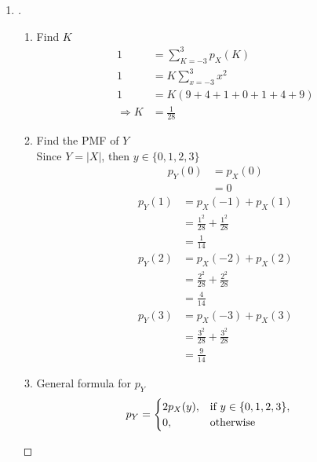 \documentclass[paper=usletter, fontsize=12pt]{article}
\begin{document}
\begin{enumerate}
        \item
        \begin{proof}[\unskip\nopunct]

            \begin{enumerate}

                \item Find $K$
                \begin{align*}
                    1 & = \sum_{K = -3}^{3} p_X(K)\\
                    1 & = K\sum_{x = -3}^{3} x^2\\
                    1 & = K(9 + 4 + 1 + 0 + 1 + 4 + 9) \\
                    \Rightarrow K & = \frac{1}{28}
                \end{align*}

                \item Find the PMF of $Y$\\
                Since $Y = |X|$, then $y \in \{0,1,2,3\}$\\
                \begingroup
                \addtolength{\jot}{1em}
                \begin{align*}
                    p_Y(0) & = p_X(0)\\
                    & = 0
                \end{align*}
                \begin{align*}
                    p_Y(1) & = p_X(-1) + p_X(1)\\
                    & = \frac{1^2}{28} + \frac{1^2}{28}\\
                    & = \frac{1}{14}
                \end{align*}
                \begin{align*}
                    p_Y(2) & = p_X(-2) + p_X(2)\\
                    & = \frac{2^2}{28} + \frac{2^2}{28}\\
                    & = \frac{4}{14}
                \end{align*}
                \begin{align*}
                    p_Y(3) & = p_X(-3) + p_X(3)\\
                    & = \frac{3^2}{28} + \frac{3^2}{28}\\
                    & = \frac{9}{14}
                \end{align*}
                \endgroup

                \item General formula for $p_Y$
                \begin{align*}
                    p_Y & =
                    \begin{cases}
                        2p_X(y), & \text{if}\ y \in \{0,1,2,3\},\\
                        0, & \text{otherwise}
                    \end{cases} \qedhere
                \end{align*}


\end{enumerate}
\end{proof}
\end{enumerate}
\end{document}
